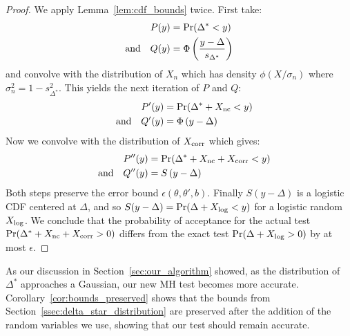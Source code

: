 \documentclass[twoside]{article} \usepackage{aistats2017}
\begin{document}
\begin{proof}
We apply Lemma~\ref{lem:cdf_bounds} twice. First take:
\begin{equation}
\begin{split}
    P(y) & = {\rm Pr}(\Delta^* < y) \\
     {\rm and} \quad Q(y) & = \Phi\left(\frac{y-\Delta}{s_{\Delta^*}}\right)
\end{split}
\end{equation}
and convolve with the distribution of $X_n$ which has density $\phi(X/\sigma_n)$
where $\sigma_n^2 = 1 - s^2_{\Delta^*}$. This yields the next iteration of $P$
and $Q$:
\begin{equation}
\begin{split}
    P'(y) & = {\rm Pr}(\Delta^*+X_{\rm nc} < y) \\
    \quad {\rm and}\quad Q'(y) & = \Phi\left({y-\Delta}\right)
\end{split}
\end{equation}
Now we convolve with the distribution of $X_{\rm corr}$ which gives:
\begin{equation}
\begin{split}
    P''(y) & = {\rm Pr}(\Delta^*+X_{\rm nc}+X_{\rm corr} < y) \\
    \quad {\rm and}\quad Q''(y) & = S\left({y-\Delta}\right)
\end{split}
\end{equation}
Both steps preserve the error bound $\epsilon(\theta,\theta',b)$. Finally
$S(y-\Delta)$ is a logistic CDF centered at $\Delta$, and so $S(y-\Delta) = {\rm
Pr}(\Delta + X_{\rm log} < y)$ for a logistic random $X_{\rm log}$. We conclude
that the probability of acceptance for the actual test ${\rm Pr}(\Delta^*+X_{\rm
nc}+X_{\rm corr} > 0)$ differs from the exact test ${\rm Pr}(\Delta+X_{\rm
log} > 0)$ by at most $\epsilon$.
\end{proof}

As our discussion in Section~\ref{sec:our_algorithm} showed, as the distribution
of $\Delta^*$ approaches a Gaussian, our new MH test becomes more accurate.
Corollary~\ref{cor:bounds_preserved} shows that the bounds from
Section~\ref{ssec:delta_star_distribution} are preserved after the addition of
the random variables we use, showing that our test should remain accurate.

\end{document}
